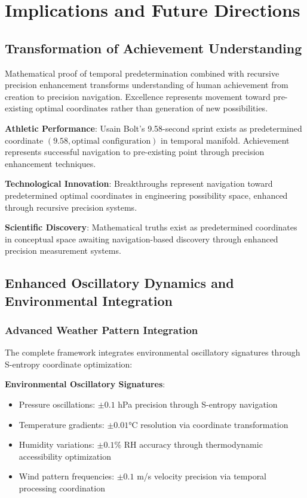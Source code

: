 \documentclass[12pt,a4paper]{article}
\begin{document}
{\section{Implications and Future Directions}

\subsection{Transformation of Achievement Understanding}

Mathematical proof of temporal predetermination combined with recursive precision enhancement transforms understanding of human achievement from creation to precision navigation. Excellence represents movement toward pre-existing optimal coordinates rather than generation of new possibilities.

\textbf{Athletic Performance}: Usain Bolt's 9.58-second sprint exists as predetermined coordinate $(9.58, \text{optimal configuration})$ in temporal manifold. Achievement represents successful navigation to pre-existing point through precision enhancement techniques.

\textbf{Technological Innovation}: Breakthroughs represent navigation toward predetermined optimal coordinates in engineering possibility space, enhanced through recursive precision systems.

\textbf{Scientific Discovery}: Mathematical truths exist as predetermined coordinates in conceptual space awaiting navigation-based discovery through enhanced precision measurement systems.

\subsection{Enhanced Oscillatory Dynamics and Environmental Integration}

\subsubsection{Advanced Weather Pattern Integration}

The complete framework integrates environmental oscillatory signatures through S-entropy coordinate optimization:

\textbf{Environmental Oscillatory Signatures}:
\begin{itemize}
\item Pressure oscillations: $\pm 0.1$ hPa precision through S-entropy navigation
\item Temperature gradients: $\pm 0.01$°C resolution via coordinate transformation
\item Humidity variations: $\pm 0.1$\% RH accuracy through thermodynamic accessibility optimization
\item Wind pattern frequencies: $\pm 0.1$ m/s velocity precision via temporal processing coordination
\end{itemize}

}
\end{document}
